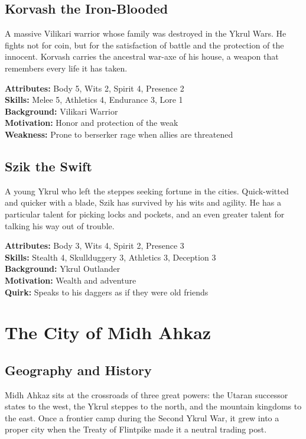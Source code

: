 \documentclass[12pt,twoside]{article}
\begin{document}
\subsection{Korvash the Iron-Blooded}

A massive Vilikari warrior whose family was destroyed in the Ykrul Wars. He fights not for coin, but for the satisfaction of battle and the protection of the innocent. Korvash carries the ancestral war-axe of his house, a weapon that remembers every life it has taken.

\textbf{Attributes:} Body 5, Wits 2, Spirit 4, Presence 2 \\
\textbf{Skills:} Melee 5, Athletics 4, Endurance 3, Lore 1 \\
\textbf{Background:} Vilikari Warrior \\
\textbf{Motivation:} Honor and protection of the weak \\
\textbf{Weakness:} Prone to berserker rage when allies are threatened

\subsection{Szik the Swift}

A young Ykrul who left the steppes seeking fortune in the cities. Quick-witted and quicker with a blade, Szik has survived by his wits and agility. He has a particular talent for picking locks and pockets, and an even greater talent for talking his way out of trouble.

\textbf{Attributes:} Body 3, Wits 4, Spirit 2, Presence 3 \\
\textbf{Skills:} Stealth 4, Skullduggery 3, Athletics 3, Deception 3 \\
\textbf{Background:} Ykrul Outlander \\
\textbf{Motivation:} Wealth and adventure \\
\textbf{Quirk:} Speaks to his daggers as if they were old friends

\section{The City of Midh Ahkaz}

\subsection{Geography and History}

Midh Ahkaz sits at the crossroads of three great powers: the Utaran successor states to the west, the Ykrul steppes to the north, and the mountain kingdoms to the east. Once a frontier camp during the Second Ykrul War, it grew into a proper city when the Treaty of Flintpike made it a neutral trading post.
\end{document}
